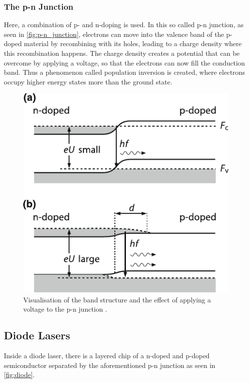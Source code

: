 \subsubsection{The p-n Junction}
Here, a combination of p- and n-doping is used.
In this so called p-n junction, as seen in \autoref{fig:p-n_junction}, electrons can move into the valence band of the p-doped material
by recombining with its holes, leading to a charge density where this recombination happens.
The charge density creates a potential that can be overcome by applying a voltage, so that the electrons can now fill the conduction band.
Thus a phenomenon called population inversion is created, where electrons occupy higher energy states more than the ground state.

\begin{figure}[H]
    \centering
    \includegraphics{figures/p-n_junction.pdf}
    \caption{Visualisation of the band structure and the effect of applying a voltage to the p-n junction \cite{laser}.}
    \label{fig:p-n_junction}
\end{figure}


\subsection{Diode Lasers}
Inside a diode laser, there is a layered chip of a n-doped and p-doped semiconductor separated by the aforementioned p-n junction as seen in \autoref{fig:diode}.

